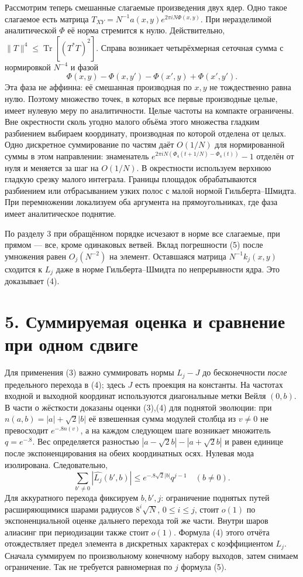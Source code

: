 \documentclass[11pt,a4paper]{article}
\newcommand{\Tr}{\operatorname{Tr}}
\newcommand{\sect}[1]{\section*{\sffamily\color{ink}#1}}
\begin{document}
Рассмотрим теперь смешанные слагаемые произведения двух ядер. Одно такое слагаемое есть матрица $T_{XY}=N^{-1}a(x,y)e^{2\pi iN\Phi(x,y)}$. При неразделимой аналитической $\Phi$ её норма стремится к нулю. Действительно, $\|T\|^4\le\Tr[(T^*T)^2]$. Справа возникает четырёхмерная сеточная сумма с нормировкой $N^{-4}$ и фазой
\[
 \Phi(x,y)-\Phi(x,y')-\Phi(x',y)+\Phi(x',y').
\]
Эта фаза не аффинна: её смешанная производная по $x,y$ не тождественно равна нулю. Поэтому множество точек, в которых все первые производные целые, имеет нулевую меру по аналитичности. Целые частоты на компакте ограничены. Вне окрестности сколь угодно малого объёма этого множества гладким разбиением выбираем координату, производная по которой отделена от целых. Одно дискретное суммирование по частям даёт $O(1/N)$ для нормированной суммы в этом направлении: знаменатель $e^{2\pi iN(\Phi_4(t+1/N)-\Phi_4(t))}-1$ отделён от нуля и меняется за шаг на $O(1/N)$. В окрестности используем верхнюю гладкую срезку малого интеграла. Границы площадок обрабатываются разбиением или отбрасыванием узких полос с малой нормой Гильберта--Шмидта. При перемножении локализуем оба аргумента на прямоугольниках, где фаза имеет аналитическое поднятие.

По разделу 3 при обращённом порядке исчезают в норме все слагаемые, при прямом --- все, кроме одинаковых ветвей. Вклад погрешности (5) после умножения равен $O_j(N^{-2})$ на элемент. Оставшаяся матрица $N^{-1}k_j(x,y)$ сходится к $L_j$ даже в норме Гильберта--Шмидта по непрерывности ядра. Это доказывает (4).
\newpage
\sect{5. Суммируемая оценка и сравнение при одном сдвиге}
Для применения (3) важно суммировать нормы $L_j-J$ до бесконечности \emph{после} предельного перехода в (4); здесь $J$ есть проекция на константы. На частотах входной и выходной координат используются диагональные метки Вейля $(0,b)$. В части о жёсткости доказаны оценки (3),(4) для поднятой эволюции: при $n(a,b)=|a|+\sqrt2|b|$ её взвешенная сумма модулей столбца из $v\ne0$ не превосходит $e^{-.8n(v)}$, а на каждом следующем шаге возникает множитель $q=e^{-.8}$. Вес определяется разностью $|a-\sqrt2 b|-|a+\sqrt2 b|$ и равен единице после экспоненцирования на обеих координатных осях. Нулевая мода изолирована. Следовательно,
\[
 \sum_{b'\ne0}|\widehat{L_j}(b',b)|
                   \le e^{-.8\sqrt2|b|}q^{j-1} \quad(b\ne0).                \tag{6}
\]
Для аккуратного перехода фиксируем $b,b',j$: ограничение поднятых путей расширяющимися шарами радиусов $8^i\sqrt N$, $0\le i\le j$, стоит $o(1)$ по экспоненциальной оценке дальнего перехода той же части. Внутри шаров алиасинг при периодизации также стоит $o(1)$. Формула (4) этого отчёта отождествляет предел элемента в дискретных характерах с коэффициентом $L_j$. Сначала суммируем по произвольному конечному набору выходов, затем снимаем ограничение. Так не требуется равномерная по $j$ формула (5).
\end{document}
